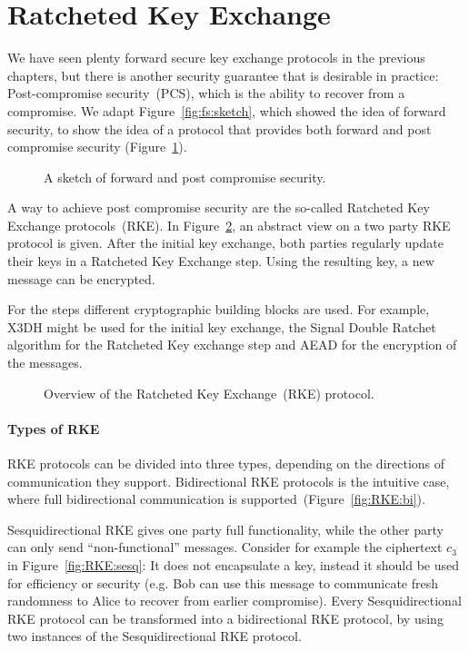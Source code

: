 \section{Ratcheted Key Exchange}
\label{sec:rke}

We have seen plenty forward secure key exchange protocols in the previous chapters, but there is another security guarantee that is desirable in practice:
Post-compromise security~(PCS), which is the ability to recover from a compromise.
We adapt Figure~\ref{fig:fs:sketch}, which showed the idea of forward security, to show the idea of a protocol that provides both forward and post compromise security (Figure~\ref{fig:rke:pcs_fs_overview}).

\begin{figure}[!ht]
    \centering
    
    \caption{A sketch of forward and post compromise security.}
    \label{fig:rke:pcs_fs_overview}
\end{figure}

A way to achieve post compromise security are the so-called Ratcheted Key Exchange protocols~(RKE).
In Figure~\ref{fig:rke:overview}, an abstract view on a two party RKE protocol is given.
After the initial key exchange, both parties regularly update their keys in a Ratcheted Key Exchange step.
Using the resulting key, a new message can be encrypted.

For the steps different cryptographic building blocks are used.
For example, X3DH might be used for the initial key exchange, the Signal Double Ratchet algorithm for the Ratcheted Key exchange step and AEAD for the encryption of the messages.

\begin{figure}[!ht]
    \centering
    
    \caption{Overview of the Ratcheted Key Exchange~(RKE) protocol.}
    \label{fig:rke:overview}
\end{figure}

\paragraph{Types of RKE} RKE protocols can be divided into three types, depending on the directions of communication they support.
Bidirectional RKE protocols is the intuitive case, where full bidirectional communication is supported~(Figure~\ref{fig:RKE:bi}).

Sesquidirectional RKE gives one party full functionality, while the other party can only send ``non-functional'' messages.
Consider for example the ciphertext $c_3$ in Figure~\ref{fig:RKE:sesq}:
It does not encapsulate a key, instead it should be used for efficiency or security (e.g. Bob can use this message to communicate fresh randomness to Alice to recover from earlier compromise).
Every Sesquidirectional RKE protocol can be transformed into a bidirectional RKE protocol, by using two instances of the Sesquidirectional RKE protocol.

